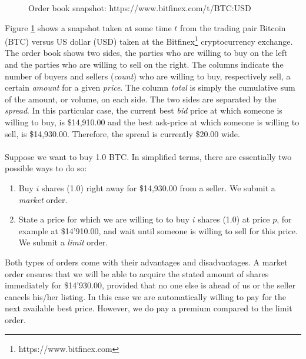 \begin{figure}[H]
    \centering
    \caption{Order book snapshot: https://www.bitfinex.com/t/BTC:USD}
    \label{fit:intro-orderbook}
\end{figure}

Figure \ref{fit:intro-orderbook} shows a snapshot taken at some time $t$ from the trading pair Bitcoin (BTC) versus US dollar (USD) taken at the Bitfinex\footnote{https://www.bitfinex.com} cryptocurrency exchange.
The order book shows two sides, the parties who are willing to buy on the left and the parties who are willing to sell on the right.
The columns indicate the number of buyers and sellers (\textit{count}) who are willing to buy, respectively sell, a certain \textit{amount} for a given \textit{price}.
The column \textit{total} is simply the cumulative sum of the amount, or volume, on each side.
The two sides are separated by the \textit{spread}. 
In this particular case, the current best \textit{bid} price at which someone is willing to buy, is \$14,910.00 and the best ask-price at which someone is willing to sell, is \$14,930.00. 
Therefore, the spread is currently \$20.00 wide.
\\
\\
Suppose we want to buy 1.0 BTC.
In simplified terms, there are essentially two possible ways to do so:
\begin{enumerate}
    \item Buy $i$ shares (1.0) right away for \$14,930.00 from a seller. We submit a \textit{market} order.
    \item State a price for which we are willing to to buy $i$ shares (1.0) at price $p$, for example at \$14'910.00, and wait until someone is willing to sell for this price. We submit a \textit{limit} order.
\end{enumerate}

Both types of orders come with their advantages and disadvantages.
A market order ensures that we will be able to acquire the stated amount of shares immediately for \$14'930.00, provided that no one else is ahead of us or the seller cancels his/her listing. 
In this case we are automatically willing to pay for the next available best price.
However, we do pay a premium compared to the limit order.

